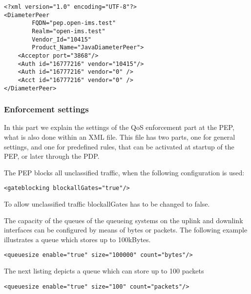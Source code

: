 \begin{lstlisting}[caption=Example of a Diameter Peer configuration file, label={lst:DiamPeerCfgPEP}]
<?xml version="1.0" encoding="UTF-8"?>
<DiameterPeer
		FQDN="pep.open-ims.test" 
		Realm="open-ims.test" 
		Vendor_Id="10415" 
		Product_Name="JavaDiameterPeer">
	<Acceptor port="3868"/>
	<Auth id="16777216" vendor="10415"/>
	<Auth id="16777216" vendor="0" />
	<Acct id="16777216" vendor="0" />
</DiameterPeer>
\end{lstlisting}

\subsubsection{Enforcement settings}
In this part we explain the settings of the QoS enforcement part at the PEP, what is also done within an XML file. 
This file has two parts, one for general settings, and one for predefined rules, that can be activated at startup of the PEP, or later through the PDP.


The PEP blocks all unclassified traffic, when the following configuration is used:
\begin{lstlisting}[caption=Activation of Gateblocking, label={lst:PEPGate}]
	<gateblocking blockallGates="true"/>
\end{lstlisting}
To allow unclassified traffic blockallGates has to be changed to false.

The capacity of the queues of the queueing systems on the uplink and downlink interfaces can be configured by means of bytes or packets.
The following example illustrates a queue which stores up to 100kBytes.
\begin{lstlisting}[caption=Queue with 100kBytes, label={lst:PEPContainer}]
	<queuesize enable="true" size="100000" count="bytes"/>
\end{lstlisting}
The next listing depicts a queue which can store up to 100 packets
\begin{lstlisting}[caption=Queue with 100 packets, label={lst:PEPContainer}]	
	<queuesize enable="true" size="100" count="packets"/>
\end{lstlisting}

